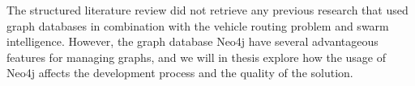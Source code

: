 The structured literature review did not retrieve any previous research that used graph databases in combination with the vehicle routing problem and swarm intelligence. However, the graph database Neo4j\citep{website:neo4j} have several advantageous features for managing graphs, and we will in thesis explore how the usage of Neo4j affects the development process and the quality of the solution.



